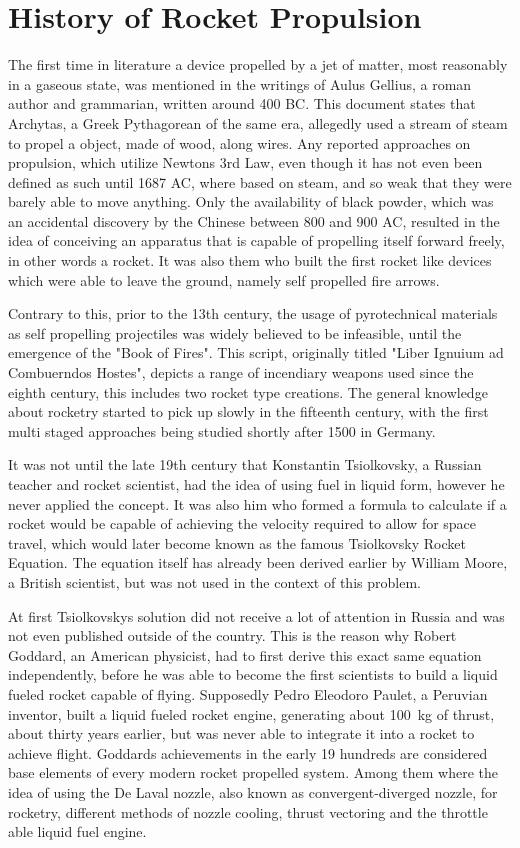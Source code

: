\section{History of Rocket Propulsion}
\author{Sebastian Schaffler}

The first time in literature a device propelled by a jet of matter, most reasonably in a gaseous state, was mentioned in the writings of Aulus Gellius, a roman author and grammarian, written around 400 BC. This document states that Archytas, a Greek Pythagorean of the same era, allegedly used a stream of steam to propel a object, made of wood, along wires. Any reported approaches on propulsion, which utilize Newtons 3rd Law, even though it has not even been defined as such until 1687 AC, where based on steam, and so weak that they were barely able to move anything. Only the availability of black powder, which was an accidental discovery by the Chinese between 800 and 900 AC, resulted in the idea of conceiving an apparatus that is capable of propelling itself forward freely, in other words a rocket. It was also them who built the first rocket like devices which were able to leave the ground, namely self propelled fire arrows.

Contrary to this, prior to the 13th century, the usage of pyrotechnical materials as self propelling projectiles was  widely believed to be infeasible, until the emergence of the "Book of Fires". This script, originally titled "Liber Ignuium ad Combuerndos Hostes", depicts a range of incendiary weapons used since the eighth century, this includes two rocket type creations. The general knowledge about rocketry started to pick up slowly in the fifteenth century, with the first multi staged approaches being studied shortly after 1500 in Germany.

It was not until the late 19th century that Konstantin Tsiolkovsky, a Russian teacher and rocket scientist, had the idea of using fuel in liquid form, however he never applied the concept. It was also him who formed a formula to calculate if a rocket would be capable of achieving the velocity required to allow for space travel, which would later become known as the famous Tsiolkovsky Rocket Equation. The equation itself has already been derived earlier by William Moore, a British scientist, but was not used in the context of this problem. 

At first Tsiolkovskys solution did not receive a lot of attention in Russia and was not even published outside of the country. This is the reason why Robert Goddard, an American physicist, had to first derive this exact same equation independently, before he was able to become the first scientists to build a liquid fueled rocket capable of flying. Supposedly Pedro Eleodoro Paulet, a Peruvian inventor, built a liquid fueled rocket engine, generating about \SI{100}{\kilo\gram} of thrust, about thirty years earlier, but was never able to integrate it into a rocket to achieve flight. Goddards achievements in the early 19 hundreds are considered base elements of every modern rocket propelled system. Among them where the idea of using the De Laval nozzle, also known as convergent-diverged nozzle, for rocketry, different methods of nozzle cooling, thrust vectoring and the throttle able liquid fuel engine.


